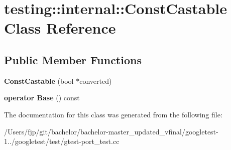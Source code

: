 \hypertarget{classtesting_1_1internal_1_1_const_castable}{}\section{testing\+:\+:internal\+:\+:Const\+Castable Class Reference}
\label{classtesting_1_1internal_1_1_const_castable}
\subsection*{Public Member Functions}
\begin{DoxyCompactItemize}
\item 
\mbox{\label{classtesting_1_1internal_1_1_const_castable_a78eba470cc71528237a33a10a92fba7e}} 
{\bfseries Const\+Castable} (bool $\ast$converted)
\item 
\mbox{\label{classtesting_1_1internal_1_1_const_castable_af084893d6786010022297b1e88f4743b}} 
{\bfseries operator Base} () const
\end{DoxyCompactItemize}


The documentation for this class was generated from the following file\+:\begin{DoxyCompactItemize}
\item 
/\+Users/fjp/git/bachelor/bachelor-\/master\+\_\+updated\+\_\+vfinal/googletest-\/1../googletest/test/gtest-\/port\+\_\+test.\+cc\end{DoxyCompactItemize}

